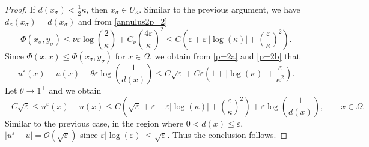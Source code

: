 \documentclass[11pt,reqno]{amsart}
\numberwithin{figure}{section}
\theoremstyle{plain}
\theoremstyle{remark}
\newtheorem{rem}{\bf{Remark}}
\numberwithin{equation}{section}
\begin{document}
\begin{proof}
\noindent
If $d(x_\sigma)<\frac{1}{2}\kappa$, then $x_\sigma\in U_\kappa$. Similar to the previous argument, we have $d_\kappa(x_\sigma) = d(x_\sigma)$ and from \eqref{annulus2p=2}
\begin{equation}\label{p=2b}
    \Phi(x_\sigma,y_\sigma) \leq \nu\varepsilon \log\left(\frac{2}{\kappa}\right) + C_\nu\left(\frac{4\varepsilon}{\kappa}\right)^2 \leq C\left(\varepsilon+\varepsilon\,|\log(\kappa)| + \left(\frac{\varepsilon}{\kappa}\right)^2\right).
\end{equation}
Since $\Phi(x,x)\leq \Phi(x_\sigma,y_\sigma)$ for $x\in \Omega$, we obtain from \eqref{p=2a} and \eqref{p=2b} that
\begin{equation*}
    u^\varepsilon(x) - u(x) - \theta\varepsilon\log\left(\frac{1}{d(x)}\right) \leq C\sqrt{\varepsilon} +C\varepsilon \left(1+|\log(\kappa)| + \frac{\varepsilon}{\kappa^2}\right).
\end{equation*}
Let $\theta\to 1^+$ and we obtain 
\begin{equation*}
    -C\sqrt{\varepsilon}\leq u^\varepsilon(x) - u(x) \leq C \left(\sqrt{\varepsilon}+\varepsilon+\varepsilon|\log(\kappa)| + \left(\frac{\varepsilon}{\kappa}\right)^2\right) +  \varepsilon \log\left(\frac{1}{d(x)}\right), \qquad x\in \Omega.
\end{equation*}
Similar to the previous case, in the region where $0< d(x)\leq \varepsilon$, $|u^\varepsilon-u|=\mathcal{O}(\sqrt{\varepsilon})$ since $\varepsilon|\log(\varepsilon)|\leq \sqrt{\varepsilon}$. Thus the conclusion follows.
\end{proof}


\end{document}
